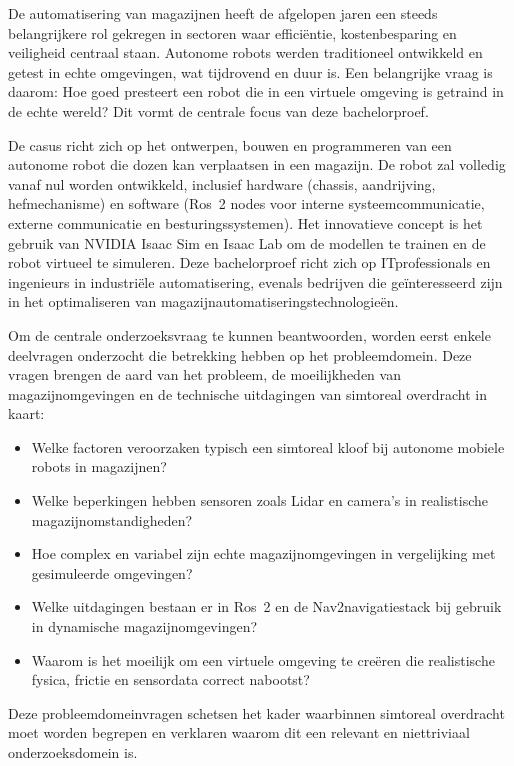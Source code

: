 De automatisering van magazijnen heeft de afgelopen jaren een steeds belangrijkere rol gekregen in sectoren waar efficiëntie, kostenbesparing en veiligheid centraal staan. Autonome robots werden traditioneel ontwikkeld en getest in echte omgevingen, wat tijdrovend en duur is. Een belangrijke vraag is daarom: Hoe goed presteert een robot die in een virtuele omgeving is getraind in de echte wereld? Dit vormt de centrale focus van deze bachelorproef.

De casus richt zich op het ontwerpen, bouwen en programmeren van een autonome robot die dozen kan verplaatsen in een magazijn. De robot zal volledig vanaf nul worden ontwikkeld, inclusief hardware (chassis, aandrijving, hefmechanisme) en software (Ros~2 nodes voor interne systeemcommunicatie, externe communicatie en besturingssystemen). Het innovatieve concept is het gebruik van NVIDIA Isaac Sim en Isaac Lab om de modellen te trainen en de robot virtueel te simuleren. Deze bachelorproef richt zich op IT\-professionals en ingenieurs in industriële automatisering, evenals bedrijven die geïnteresseerd zijn in het optimaliseren van magazijnautomatiseringstechnologieën.

Om de centrale onderzoeksvraag te kunnen beantwoorden, worden eerst enkele deelvragen onderzocht die betrekking hebben op het probleemdomein. Deze vragen brengen de aard van het probleem, de moeilijkheden van magazijnomgevingen en de technische uitdagingen van sim\-to\-real overdracht in kaart:

\begin{itemize}
    \item Welke factoren veroorzaken typisch een sim\-to\-real kloof bij autonome mobiele robots in magazijnen?
    \item Welke beperkingen hebben sensoren zoals Lidar en camera’s in realistische magazijnomstandigheden?
    \item Hoe complex en variabel zijn echte magazijnomgevingen in vergelijking met gesimuleerde omgevingen?
    \item Welke uitdagingen bestaan er in Ros~2 en de Nav2\-navigatiestack bij gebruik in dynamische magazijnomgevingen?
    \item Waarom is het moeilijk om een virtuele omgeving te creëren die realistische fysica, frictie en sensordata correct nabootst?
\end{itemize}

Deze probleemdomeinvragen schetsen het kader waarbinnen sim\-to\-real overdracht moet worden begrepen en verklaren waarom dit een relevant en niet\-triviaal onderzoeksdomein is.


